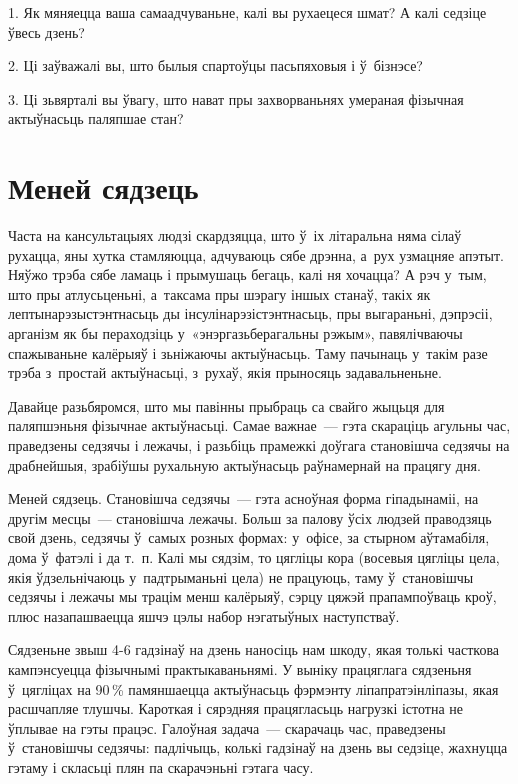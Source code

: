 1. Як мяняецца ваша самаадчуваньне, калі вы рухаецеся шмат? А калі седзіце ўвесь дзень?

2. Ці заўважалі вы, што былыя спартоўцы пасьпяховыя і ў~бізнэсе?

3. Ці зьвярталі вы ўвагу, што нават пры захворваньнях умераная фізычная актыўнасьць паляпшае стан?


\section{Меней сядзець}

Часта на кансультацыях людзі скардзяцца, што ў~іх літаральна няма сілаў рухацца, яны хутка стамляюцца, адчуваюць сябе дрэнна, а~рух узмацняе апэтыт. Няўжо трэба сябе ламаць і прымушаць бегаць, калі ня хочацца? А рэч у~тым, што пры атлусьценьні, а~таксама пры шэрагу іншых станаў, такіх як лептынарэзыстэнтнасьць ды інсулінарэзістэнтнасьць, пры выгараньні, дэпрэсіі, арганізм як бы пераходзіць у~«энэргазьберагальны рэжым», павялічваючы спажываньне калёрыяў і зьніжаючы актыўнасьць. Таму пачынаць у~такім разе трэба з~простай актыўнасьці, з~рухаў, якія прыносяць задавальненьне.

Давайце разьбяромся, што мы павінны прыбраць са свайго жыцьця для паляпшэньня фізычнае актыўнасьці. Самае важнае~--- гэта скараціць агульны час, праведзены седзячы і лежачы, і разьбіць прамежкі доўгага становішча седзячы на драбнейшыя, зрабіўшы рухальную актыўнасьць раўнамернай на працягу дня.

Меней сядзець. Становішча седзячы~--- гэта асноўная форма гіпадынаміі, на другім месцы~--- становішча лежачы. Больш за палову ўсіх людзей праводзяць свой дзень, седзячы ў~самых розных формах: у~офісе, за стырном аўтамабіля, дома ў~фатэлі і да т.~п. Калі мы сядзім, то цягліцы кора (восевыя цягліцы цела, якія ўдзельнічаюць у~падтрыманьні цела) не працуюць, таму ў~становішчы седзячы і лежачы мы трацім менш калёрыяў, сэрцу цяжэй прапампоўваць кроў, плюс назапашваецца яшчэ цэлы набор нэгатыўных наступстваў.

Сядзеньне звыш 4-6 гадзінаў на дзень наносіць нам шкоду, якая толькі часткова кампэнсуецца фізычнымі практыкаваньнямі. У выніку працяглага сядзеньня ў~цягліцах на 90\,\% памяншаецца актыўнасьць фэрмэнту ліпапратэінліпазы, якая расшчапляе тлушчы. Кароткая і сярэдняя працягласьць нагрузкі істотна не ўплывае на гэты працэс. Галоўная задача~--- скарачаць час, праведзены ў~становішчы седзячы: падлічыць, колькі гадзінаў на дзень вы седзіце, жахнуцца гэтаму і скласьці плян па скарачэньні гэтага часу.

